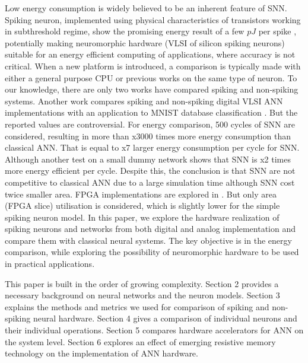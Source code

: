 \documentclass[conference, compsoc]{IEEEtran}
\begin{document}
Low energy consumption is widely believed to be an inherent feature of SNN. Spiking neuron, implemented using physical characteristics of transistors working in subthreshold regime, show the promising energy result of a few $ pJ $ per spike \cite{Indiveri,Phong,HardwareOrAnalog,Wijekoon_compact_silicon_circuit,Energy-Efficient-Neuron}, potentially making neuromorphic hardware (VLSI of silicon spiking neurons) suitable for an energy efficient computing of applications, where accuracy is not critical. When a new platform is introduced, a comparison is typically made with either a general purpose CPU or previous works on the same type of neuron. To our knowledge, there are only two works have compared spiking and non-spiking systems. Another work compares spiking and non-spiking digital VLSI ANN implementations with an application to MNIST database classification \cite{Temam:comparison}. But the reported values are controversial. For energy comparison, 500 cycles of SNN are considered, resulting in more than x3000 times more energy consumption than classical ANN. That is equal to x7 larger energy consumption per cycle for SNN. Although another test on a small dummy network shows that SNN is x2 times more energy efficient per cycle. Despite this, the conclusion is that SNN are not competitive to classical ANN due to a large simulation time although SNN cost twice smaller area. FPGA implementations are explored in \cite{Johnston2005}. But only area (FPGA slice) utilisation is considered, which is slightly lower for the simple spiking neuron model. In this paper, we explore the hardware realization of spiking neurons and networks from both digital and analog implementation and compare them with classical neural systems. The key objective is in the energy comparison, while exploring the possibility of neuromorphic hardware to be used in practical applications.

This paper is built in the order of growing complexity. Section 2 provides a necessary background on neural networks and the neuron models. Section 3 explains the methods and metrics we used for comparison of spiking and non-spiking neural hardware. Section 4 gives a comparison of individual neurons and their individual operations. Section 5 compares hardware accelerators for ANN on the system level. Section 6 explores an effect of emerging resistive memory technology on the implementation of ANN hardware.
\end{document}
